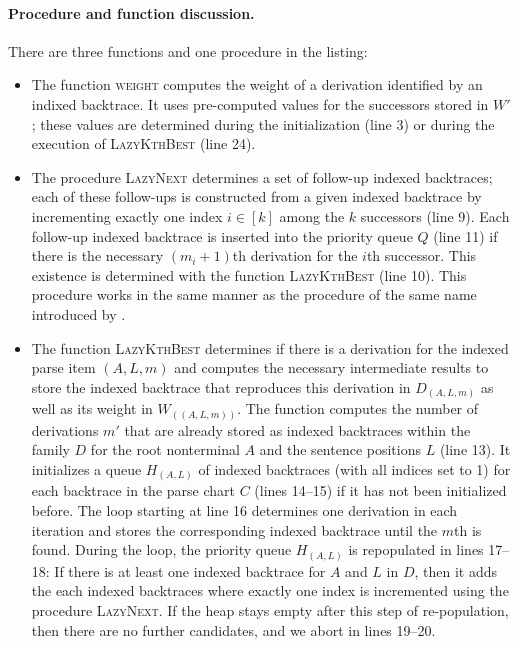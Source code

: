 \documentclass[../../document.tex]{subfiles}
\begin{document}
    \paragraph{Procedure and function discussion.}
    There are three functions and one procedure in the listing:
    \begin{itemize}
        \item The function \textsc{weight} computes the weight of a derivation identified by an indixed backtrace.
            It uses pre-computed values for the successors stored in \(W'\); these values are determined during the initialization (line 3) or during the execution of \textsc{LazyKthBest} (line 24).
        \item The procedure \textsc{LazyNext} determines a set of follow-up indexed backtraces; each of these follow-ups is constructed from a given indexed backtrace by incrementing exactly one index \(i \in [k]\) among the \(k\) successors (line 9).
            Each follow-up indexed backtrace is inserted into the priority queue \(Q\) (line 11) if there is the necessary \((m_i+1)\)th derivation for the \(i\)th successor.
            This existence is determined with the function \textsc{LazyKthBest} (line 10).
            This procedure works in the same manner as the procedure of the same name introduced by .
        \item The function \textsc{LazyKthBest} determines if there is a derivation for the indexed parse item \((A, L, m)\) and computes the necessary intermediate results to store the indexed backtrace that reproduces this derivation in \(D_{(A, L, m)}\) as well as its weight in \(W_{((A, L, m))}\).
            The function computes the number of derivations \(m'\) that are already stored as indexed backtraces within the family \(D\) for the root nonterminal \(A\) and the sentence positions \(L\) (line 13).
            It initializes a queue \(H_{(A, L)}\) of indexed backtraces (with all indices set to 1) for each backtrace in the parse chart \(C\) (lines 14--15) if it has not been initialized before.
            The loop starting at line 16 determines one derivation in each iteration and stores the corresponding indexed backtrace until the \(m\)th is found.
            During the loop, the priority queue \(H_{(A, L)}\) is repopulated in lines 17--18:
                If there is at least one indexed backtrace for \(A\) and \(L\) in \(D\), then it adds the each indexed backtraces where exactly one index is incremented using the procedure \textsc{LazyNext}.
            If the heap stays empty after this step of re-population, then there are no further candidates, and we abort in lines 19--20.

\end{itemize}
\end{document}
